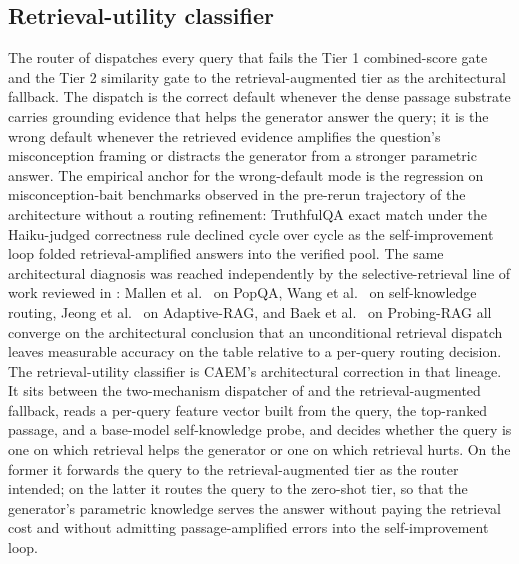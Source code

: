 \subsection{Retrieval-utility classifier}
\label{sec:ruc}

The router of  dispatches every query that fails the Tier 1 combined-score gate and the Tier 2 similarity gate to the retrieval-augmented tier as the architectural fallback. The dispatch is the correct default whenever the dense passage substrate carries grounding evidence that helps the generator answer the query; it is the wrong default whenever the retrieved evidence amplifies the question's misconception framing or distracts the generator from a stronger parametric answer. The empirical anchor for the wrong-default mode is the regression on misconception-bait benchmarks observed in the pre-rerun trajectory of the architecture without a routing refinement: TruthfulQA exact match under the Haiku-judged correctness rule declined cycle over cycle as the self-improvement loop folded retrieval-amplified answers into the verified pool. The same architectural diagnosis was reached independently by the selective-retrieval line of work reviewed in : Mallen et al.~\cite{mallen2023whennot} on PopQA, Wang et al.~\cite{wang2023skr} on self-knowledge routing, Jeong et al.~\cite{jeong2024adaptive} on Adaptive-RAG, and Baek et al.~\cite{baek2025probing} on Probing-RAG all converge on the architectural conclusion that an unconditional retrieval dispatch leaves measurable accuracy on the table relative to a per-query routing decision. The retrieval-utility classifier is CAEM's architectural correction in that lineage. It sits between the two-mechanism dispatcher of  and the retrieval-augmented fallback, reads a per-query feature vector built from the query, the top-ranked passage, and a base-model self-knowledge probe, and decides whether the query is one on which retrieval helps the generator or one on which retrieval hurts. On the former it forwards the query to the retrieval-augmented tier as the router intended; on the latter it routes the query to the zero-shot tier, so that the generator's parametric knowledge serves the answer without paying the retrieval cost and without admitting passage-amplified errors into the self-improvement loop.

